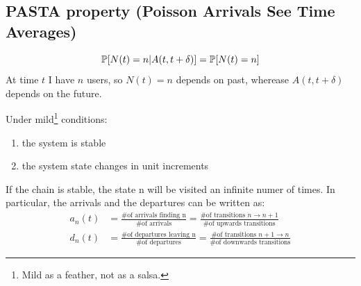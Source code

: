 \subsection{PASTA property (Poisson Arrivals See Time Averages)}
\begin{equation}
	\mathbb{P}[N(t)=n|A(t,t+\delta)] = \mathbb{P}[N(t)=n]
\end{equation}
At time $t$ I have $n$ users, so $N(t)=n$ depends on past, wherease $A(t,t+\delta)$ depends on the future.

Under mild\footnote{Mild as a feather, not as a salsa.} conditions:
\begin{enumerate}
	\item the system is stable
	\item the system state changes in unit increments
\end{enumerate}
If the chain is stable, the state n will be visited an infinite numer of times. In particular, the arrivals and the departures can be written as:
\begin{equation}\begin{split}
a_n(t)&= \frac{\text{\# of arrivals finding n}}{\text{\# of arrivals}} = \frac{\text{\# of transitions } n \to n+1}{\text{\# of upwards transitions}}\\
d_n(t)&= \frac{\text{\# of departures leaving n}}{\text{\# of departures}} = \frac{\text{\# of transitions } n+1 \to n}{\text{\# of downwards transitions}}
\end{split}\end{equation}
